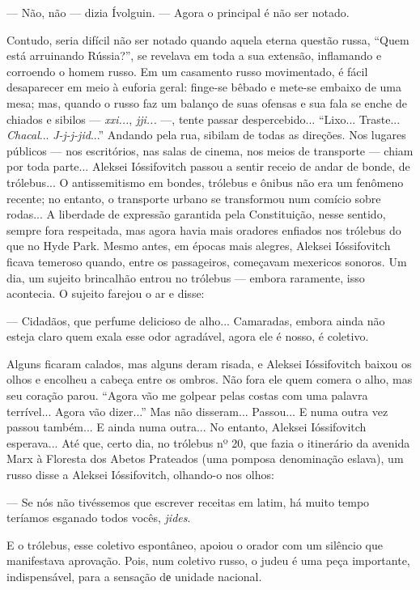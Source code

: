 --- Não, não --- dizia Ívolguin. --- Agora o principal é não ser notado.

Contudo, seria difícil não ser notado quando aquela eterna questão
russa, ``Quem está arruinando Rússia?'', se revelava em toda a sua
extensão, inflamando e corroendo o homem russo. Em um casamento russo
movimentado, é fácil desaparecer em meio à euforia geral: finge-se
bêbado e mete-se embaixo de uma mesa; mas, quando o russo faz um balanço
de suas ofensas e sua fala se enche de chiados e sibilos ---
\emph{xxi...}, \emph{jji...} ---, tente passar despercebido... ``Lixo...
Traste... \emph{Chacal}... \emph{J-j-j-jid}...'' Andando pela rua,
sibilam de todas as direções. Nos lugares públicos --- nos escritórios,
nas salas de cinema, nos meios de transporte --- chiam por toda parte...
Aleksei Ióssifovitch passou a sentir receio de andar de bonde, de
trólebus... O antissemitismo em bondes, trólebus e ônibus não era um
fenômeno recente; no entanto, o transporte urbano se transformou num
comício sobre rodas... A liberdade de expressão garantida pela
Constituição, nesse sentido, sempre fora respeitada, mas agora havia
mais oradores enfiados nos trólebus do que no Hyde Park. Mesmo antes, em
épocas mais alegres, Aleksei Ióssifovitch ficava temeroso quando, entre
os passageiros, começavam mexericos sonoros. Um dia, um sujeito
brincalhão entrou no trólebus --- embora raramente, isso acontecia. O
sujeito farejou o ar e disse:

--- Cidadãos, que perfume delicioso de alho... Camaradas, embora ainda
não esteja claro quem exala esse odor agradável, agora ele é nosso, é
coletivo.

Alguns ficaram calados, mas alguns deram risada, e Aleksei Ióssifovitch
baixou os olhos e encolheu a cabeça entre os ombros. Não fora ele quem
comera o alho, mas seu coração parou. ``Agora vão me golpear pelas
costas com uma palavra terrível... Agora vão dizer...'' Mas não
disseram... Passou... E numa outra vez passou também... E ainda numa
outra... No entanto, Aleksei Ióssifovitch esperava... Até que, certo
dia, no trólebus nº 20, que fazia o itinerário da avenida Marx à
Floresta dos Abetos Prateados (uma pomposa denominação eslava), um russo
disse a Aleksei Ióssifovitch, olhando-o nos olhos:

--- Se nós não tivéssemos que escrever receitas em latim, há muito tempo
teríamos esganado todos vocês, \emph{jides}.

E o trólebus, esse coletivo espontâneo, apoiou o orador com um silêncio
que manifestava aprovação. Pois, num coletivo russo, o judeu é uma peça
importante, indispensável, para a sensação dе unidade nacional.

